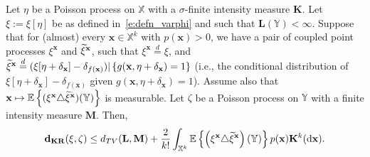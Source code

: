\documentclass[AHL,Unicode,longabstracts]{cedram}
\newcommand*\bL{\mathbf{L}}
\newcommand*\bM{\mathbf{M}}
\newcommand*\bK{\mathbf{K}}
\newcommand{\bx}{\mathbf{x}}
\newcommand*\dkr{\mathbf{d_{KR}}}
\newcommand*\X{\mathbb{X}}
\newcommand*\Y{\mathbb{Y}}
\newcommand{\E}{\mathbb{E}}
\newcommand*\txi{\tilde{\xi}}
\newcommand*\md{\mathrm{d}}
\newcommand{\mean}[1] {\E\left\{{#1}\right\}}
\newcommand{\set}[1]{\left\{#1\right\}}
\let\oldtilde\tilde
\renewcommand*{\tilde}[1]{\mathchoice{\widetilde{#1}}{\widetilde{#1}}{\oldtilde{#1}}{\oldtilde{#1}}}
\begin{document}
\begin{theo}\label{t:KR_coupling}
Let $\eta$ be a Poisson process on $\X$ with a $\sigma$-finite intensity measure $\bK$. Let $\xi := \xi[\eta]$ be as defined in~\eqref{e:defn_varphi} and such that $\bL(\Y) < \infty$. Suppose that for (almost) every $\bx\in\X^k$ with $p(\bx) > 0$, we have a pair of coupled point processes $\xi^{\bx}$ and $\txi^{\bx}$, such that $\xi^{\bx}\stackrel{d}{=}\xi$, and $\txi^{\bx} \stackrel{d}{=} (\xi[\eta + \delta_{\bx}] - \delta_{f(\bx)}) | \set{ g(\bx,\eta + \delta_\bx) = 1}$ (i.e., the conditional distribution of $\xi[\eta + \delta_{\bx}] - \delta_{f(\bx)}$ given $g(\bx,\eta + \delta_\bx) = 1$). Assume also that $\bx \mapsto\mean{(\xi^{\bx} \triangle \txi^{\bx})(\Y)}$ is measurable. Let $\zeta$ be a Poisson process on $\Y$ with a finite intensity measure $\bM$. Then,
\[
\dkr(\xi,\zeta)  \leq d_{TV}(\bL,\bM) + \frac{2}{k!} \int_{\X^k} \mean{\left(\xi^{\bx} \triangle \txi^{\bx}\right)(\Y)} p(\bx)\bK^k(\md \bx).
\]
\end{theo}
\end{document}
